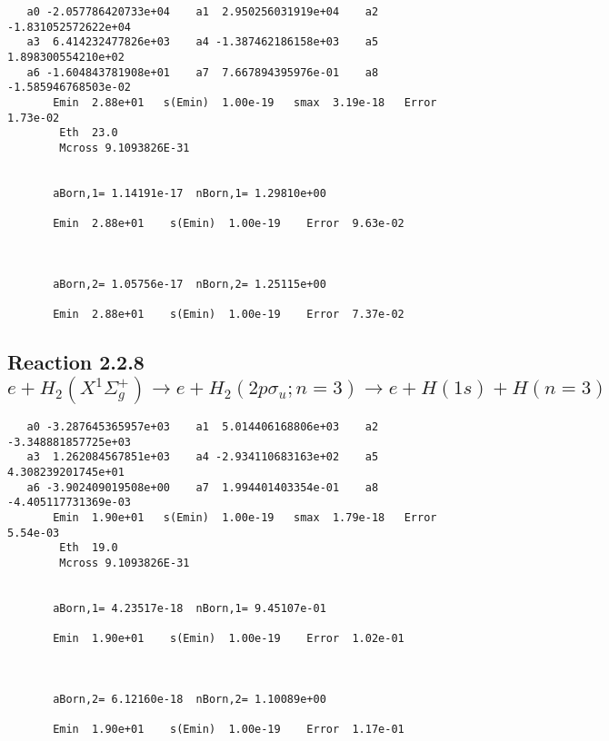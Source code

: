 \documentclass[12pt,dvipdfm]{article}
\begin{document}
\begin{small}\begin{verbatim}
   a0 -2.057786420733e+04    a1  2.950256031919e+04    a2 -1.831052572622e+04
   a3  6.414232477826e+03    a4 -1.387462186158e+03    a5  1.898300554210e+02
   a6 -1.604843781908e+01    a7  7.667894395976e-01    a8 -1.585946768503e-02
       Emin  2.88e+01   s(Emin)  1.00e-19   smax  3.19e-18   Error  1.73e-02
        Eth  23.0
        Mcross 9.1093826E-31


       aBorn,1= 1.14191e-17  nBorn,1= 1.29810e+00

       Emin  2.88e+01    s(Emin)  1.00e-19    Error  9.63e-02



       aBorn,2= 1.05756e-17  nBorn,2= 1.25115e+00

       Emin  2.88e+01    s(Emin)  1.00e-19    Error  7.37e-02
\end{verbatim}\end{small}




\newpage
\subsection{
Reaction 2.2.8 $e + H_2(X^1\Sigma_g^+) \rightarrow e + H_2(2p\sigma_u;n=3) \rightarrow e + H(1s) + H(n=3)$}
















\begin{small}\begin{verbatim}
   a0 -3.287645365957e+03    a1  5.014406168806e+03    a2 -3.348881857725e+03
   a3  1.262084567851e+03    a4 -2.934110683163e+02    a5  4.308239201745e+01
   a6 -3.902409019508e+00    a7  1.994401403354e-01    a8 -4.405117731369e-03
       Emin  1.90e+01   s(Emin)  1.00e-19   smax  1.79e-18   Error  5.54e-03
        Eth  19.0
        Mcross 9.1093826E-31


       aBorn,1= 4.23517e-18  nBorn,1= 9.45107e-01

       Emin  1.90e+01    s(Emin)  1.00e-19    Error  1.02e-01



       aBorn,2= 6.12160e-18  nBorn,2= 1.10089e+00

       Emin  1.90e+01    s(Emin)  1.00e-19    Error  1.17e-01

\end{verbatim}\end{small}
\end{document}
